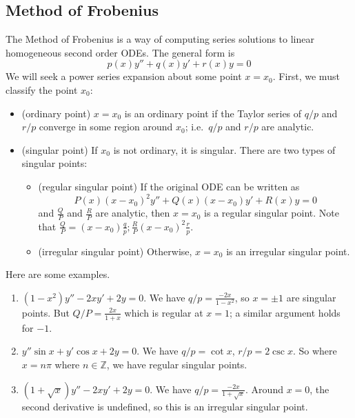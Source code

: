 \subsection{Method of Frobenius}
The Method of Frobenius is a way of computing series solutions to linear homogeneous second order ODEs.
The general form is
\[
	p(x)y'' + q(x)y' + r(x)y = 0
\]
We will seek a power series expansion about some point \(x = x_0\).
First, we must classify the point \(x_0\):
\begin{itemize}
	\item (ordinary point) \(x=x_0\) is an ordinary point if the Taylor series of \(q/p\) and \(r/p\) converge in some region around \(x_0\); i.e.\ \(q/p\) and \(r/p\) are analytic.
	\item (singular point) If \(x_0\) is not ordinary, it is singular.
	      There are two types of singular points:
	      \begin{itemize}
		      \item (regular singular point) If the original ODE can be written as
		            \[
			            P(x)(x-x_0)^2 y'' + Q(x)(x-x_0)y' + R(x)y = 0
		            \]
		            and \(\frac{Q}{P}\) and \(\frac{R}{P}\) are analytic, then \(x=x_0\) is a regular singular point.
		            Note that \(\frac{Q}{P} = (x-x_0)\frac{q}{p}; \frac{R}{P}(x-x_0)^2\frac{r}{p}\).
		      \item (irregular singular point) Otherwise, \(x=x_0\) is an irregular singular point.
	      \end{itemize}
\end{itemize}
Here are some examples.
\begin{enumerate}
	\item \((1-x^2)y'' - 2xy' + 2y = 0\).
	      We have \(q/p = \frac{-2x}{1-x^2}\), so \(x = \pm 1\) are singular points.
	      But \(Q/P = \frac{2x}{1+x}\) which is regular at \(x=1\); a similar argument holds for \(-1\).
	\item \(y''\sin x + y'\cos x + 2y = 0\).
	      We have \(q/p = \cot x\), \(r/p = 2\csc x\).
	      So where \(x = n\pi\) where \(n \in \mathbb Z\), we have regular singular points.
	\item \((1+\sqrt{x})y'' - 2xy' + 2y = 0\).
	      We have \(q/p = \frac{-2x}{1+\sqrt{x}}\).
	      Around \(x=0\), the second derivative is undefined, so this is an irregular singular point.
\end{enumerate}
